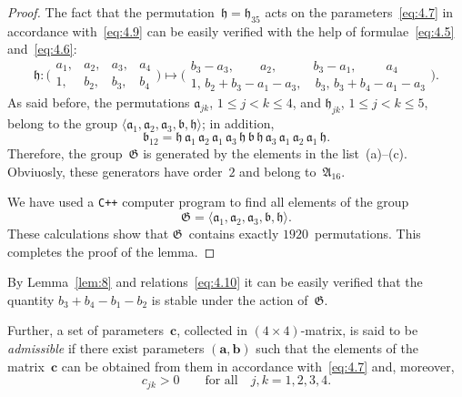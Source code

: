 \documentclass[a4paper,twoside]{article}
\numberwithin{equation}{section}
\renewcommand{\[}{\lfloor}
\renewcommand{\]}{\rfloor}
\newcommand{\<}{\langle}
\renewcommand{\>}{\rangle}
\newcommand{\ba}{\boldsymbol a}
\newcommand{\bb}{\boldsymbol b}
\newcommand{\bc}{\boldsymbol c}
\newcommand{\fa}{\mathfrak a}
\newcommand{\fb}{\mathfrak b}
\newcommand{\fh}{\mathfrak h}
\newcommand{\fA}{\mathfrak A}
\newcommand{\fG}{\mathfrak G}
\begin{document}
\begin{proof}
The fact that the permutation~$\fh=\fh_{35}$ acts on the
parameters~\eqref{eq:4.7} in accordance with~\eqref{eq:4.9} can be easily
verified with the help of formulae~\eqref{eq:4.5} and~\eqref{eq:4.6}:
\begin{equation}
\fh\colon\biggl(\begin{array}{rrrr}
a_1, & a_2, & a_3, & a_4 \\
  1, & b_2, & b_3, & b_4
\end{array}\biggr)
\mapsto\biggl(\begin{array}{rr}
b_3-a_3, \qquad a_2, \qquad & b_3-a_1, \;\qquad a_4 \qquad \\
      1, \, b_2+b_3-a_1-a_3, & \, b_3, \, b_3+b_4-a_1-a_3
\end{array}\biggr).
\label{eq:4.10}
\end{equation}
As said before, the permutations
$\fa_{jk}$, $1\le j<k\le4$,
and $\fh_{jk}$, $1\le j<k\le5$, belong to the group
$\<\fa_1,\fa_2,\fa_3,\fb,\fh\>$; in addition,
$$
\fb_{12}
=\fh\,\fa_1\,\fa_2\,\fa_1\,\fa_3\,\fh\,
\fb\,\fh\,\fa_3\,\fa_1\,\fa_2\,\fa_1\,\fh.
$$
Therefore, the group~$\fG$ is generated by the elements
in the list~(a)--(c). Obviuosly, these generators
have order~$2$ and belong to~$\fA_{16}$.

We have used a {\tt C++} computer program to find all elements
of the group
\begin{equation}
\fG=\<\fa_1,\fa_2,\fa_3,\fb,\fh\>.
\label{eq:4.11}
\end{equation}
These calculations show that $\fG$~contains exactly
$1920$~permutations. This completes the proof of the lemma.
\end{proof}

\begin{rem}
By Lemma~\ref{lem:8} and relations~\eqref{eq:4.10}
it can be easily verified that
the quantity $b_3+b_4-b_1-b_2$
is stable under the action of~$\fG$.
\end{rem}

Further, a set of parameters~$\bc$, collected in $(4\times4)$-matrix,
is said to be {\it admissible\/} if there exist parameters
$(\ba,\bb)$ such that the elements of the matrix~$\bc$ can be obtained
from them in accordance with~\eqref{eq:4.7} and, moreover,
\begin{equation}
c_{jk}>0 \qquad\mbox{for all}\quad j,k=1,2,3,4.
\label{eq:4.12}
\end{equation}
\end{document}
